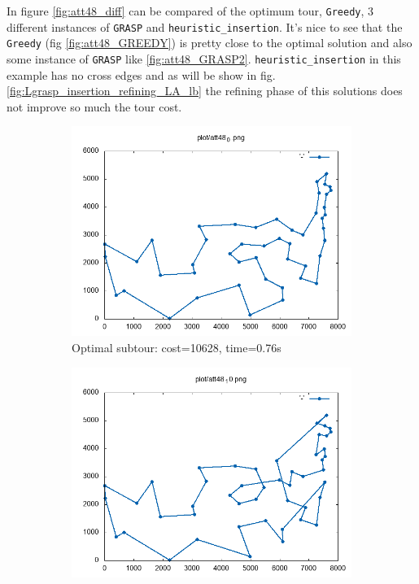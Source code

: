 In figure \ref{fig:att48_diff} can be compared of the optimum tour, \texttt{Greedy}, 3 different instances of \texttt{GRASP} and \texttt{heuristic\_insertion}. It's nice to see that the \texttt{Greedy} (fig \ref{fig:att48_GREEDY}) is pretty close to the optimal solution and also some instance of \texttt{GRASP} like \ref{fig:att48_GRASP2}. \texttt{heuristic\_insertion} in this example has no cross edges and as will be show in fig. \ref{fig:Lgrasp_insertion_refining_LA_lb} the refining phase of this solutions does not improve so much the tour cost.
\begin{figure}[!h]
	\begin{subfigure}{.49\textwidth}
		\centering
		\includegraphics[width=\columnwidth]{../res/att48_0.png}
		\caption{Optimal subtour: cost=10628, time=0.76s}
		\label{fig:att48_best}
	\end{subfigure}
	\begin{subfigure}{.49\textwidth}
		\centering
		\includegraphics[width=\columnwidth]{../res/att48_10.png}

\end{subfigure}
\end{figure}
